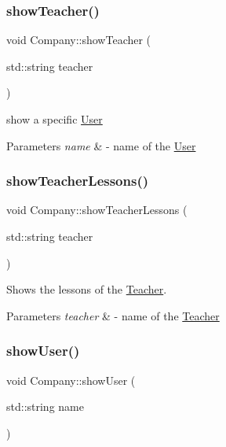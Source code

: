 \subsubsection{\texorpdfstring{show\+Teacher()}{showTeacher()}}
{\footnotesize\ttfamily void Company\+::show\+Teacher (\begin{DoxyParamCaption}\item[{std\+::string}]{teacher }\end{DoxyParamCaption})}



show a specific \mbox{\hyperlink{class_user}{User}} 


\begin{DoxyParams}{Parameters}
{\em name} & -\/ name of the \mbox{\hyperlink{class_user}{User}} \\
\hline
\end{DoxyParams}
\mbox{\label{class_company_aef95f2feab286505091c38db23cd1c90}} 
\subsubsection{\texorpdfstring{show\+Teacher\+Lessons()}{showTeacherLessons()}}
{\footnotesize\ttfamily void Company\+::show\+Teacher\+Lessons (\begin{DoxyParamCaption}\item[{std\+::string}]{teacher }\end{DoxyParamCaption})}



Shows the lessons of the \mbox{\hyperlink{class_teacher}{Teacher}}. 


\begin{DoxyParams}{Parameters}
{\em teacher} & -\/ name of the \mbox{\hyperlink{class_teacher}{Teacher}} \\
\hline
\end{DoxyParams}
\mbox{\label{class_company_a664aa9b9bde35eae3a564edec73cf5b3}} 
\subsubsection{\texorpdfstring{show\+User()}{showUser()}}
{\footnotesize\ttfamily void Company\+::show\+User (\begin{DoxyParamCaption}\item[{std\+::string}]{name }\end{DoxyParamCaption})}



